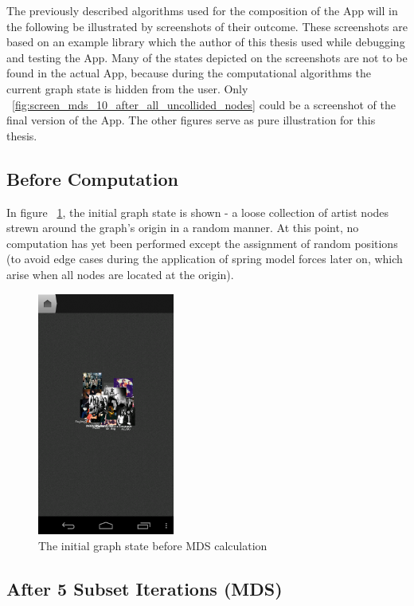 The previously described algorithms used for the composition of the App will in the following be  illustrated by screenshots of their outcome. These screenshots are based on an example library which the author of this thesis used while debugging and testing the App. Many of the states depicted on the screenshots are not to be found in the actual App, because during the computational algorithms the current graph state is hidden from the user. Only ~\ref{fig:screen_mds_10_after_all_uncollided_nodes} could be a screenshot of the final version of the App. The other figures serve as pure illustration for this thesis.

\subsection{Before Computation}

In figure ~\ref{fig:screen_mds_1_initial}, the initial graph state is shown - a loose collection of artist nodes strewn around the graph's origin in a random manner. At this point, no computation has yet been performed except the assignment of random positions (to avoid edge cases during the application of spring model forces later on, which arise when all nodes are located at the origin).

\begin{figure}[H]
  \centering
    \includegraphics[width=0.4\textwidth]{figures/screen_mds_1_initial}
  \caption{The initial graph state before MDS calculation}
  \label{fig:screen_mds_1_initial}
\end{figure}

\newpage
\subsection{After 5 Subset Iterations (MDS)}
\label{subsec:mds-after-five-subset-iterations}

